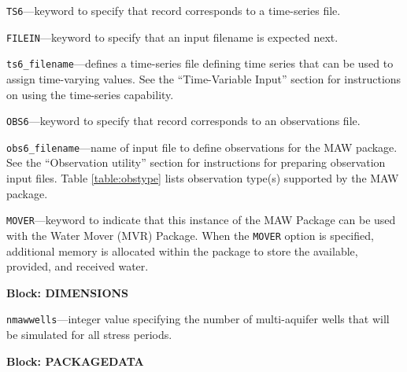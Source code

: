 \begin{description}
\item \texttt{TS6}---keyword to specify that record corresponds to a time-series file.

\item \texttt{FILEIN}---keyword to specify that an input filename is expected next.

\item \texttt{ts6\_filename}---defines a time-series file defining time series that can be used to assign time-varying values. See the ``Time-Variable Input'' section for instructions on using the time-series capability.

\item \texttt{OBS6}---keyword to specify that record corresponds to an observations file.

\item \texttt{obs6\_filename}---name of input file to define observations for the MAW package. See the ``Observation utility'' section for instructions for preparing observation input files. Table \ref{table:obstype} lists observation type(s) supported by the MAW package.

\item \texttt{MOVER}---keyword to indicate that this instance of the MAW Package can be used with the Water Mover (MVR) Package.  When the \texttt{MOVER} option is specified, additional memory is allocated within the package to store the available, provided, and received water.

\end{description}
\item \textbf{Block: DIMENSIONS}

\begin{description}
\item \texttt{nmawwells}---integer value specifying the number of multi-aquifer wells that will be simulated for all stress periods.

\end{description}
\item \textbf{Block: PACKAGEDATA}

